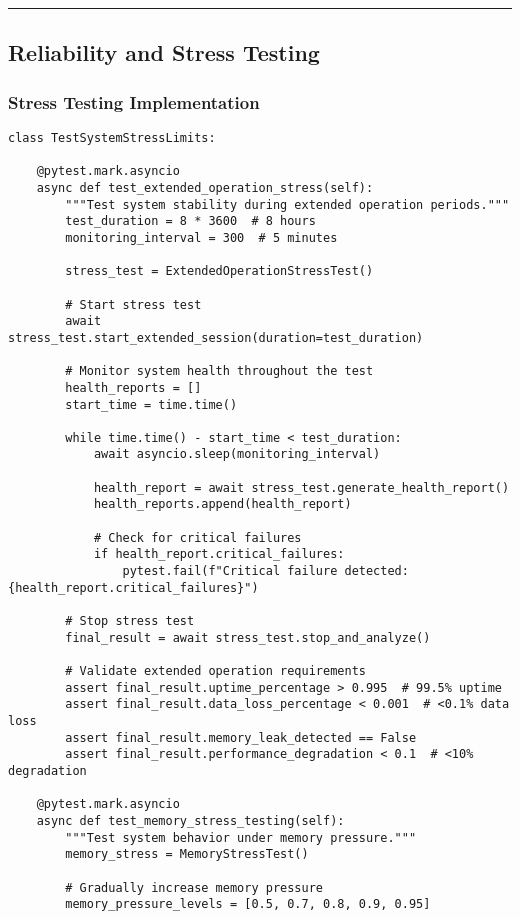 \documentclass[11pt,a4paper]{report}
\begin{document}
\hrule

\subsection{Reliability and Stress Testing}

\subsubsection{Stress Testing Implementation}

\begin{verbatim}
class TestSystemStressLimits:

    @pytest.mark.asyncio
    async def test_extended_operation_stress(self):
        """Test system stability during extended operation periods."""
        test_duration = 8 * 3600  # 8 hours
        monitoring_interval = 300  # 5 minutes

        stress_test = ExtendedOperationStressTest()

        # Start stress test
        await stress_test.start_extended_session(duration=test_duration)

        # Monitor system health throughout the test
        health_reports = []
        start_time = time.time()

        while time.time() - start_time < test_duration:
            await asyncio.sleep(monitoring_interval)

            health_report = await stress_test.generate_health_report()
            health_reports.append(health_report)

            # Check for critical failures
            if health_report.critical_failures:
                pytest.fail(f"Critical failure detected: {health_report.critical_failures}")

        # Stop stress test
        final_result = await stress_test.stop_and_analyze()

        # Validate extended operation requirements
        assert final_result.uptime_percentage > 0.995  # 99.5% uptime
        assert final_result.data_loss_percentage < 0.001  # <0.1% data loss
        assert final_result.memory_leak_detected == False
        assert final_result.performance_degradation < 0.1  # <10% degradation

    @pytest.mark.asyncio
    async def test_memory_stress_testing(self):
        """Test system behavior under memory pressure."""
        memory_stress = MemoryStressTest()

        # Gradually increase memory pressure
        memory_pressure_levels = [0.5, 0.7, 0.8, 0.9, 0.95]


\end{verbatim}
\end{document}
